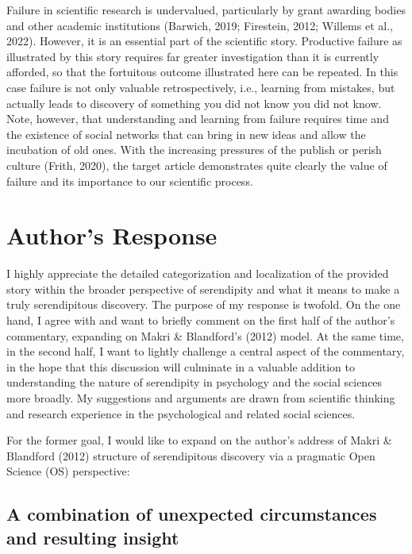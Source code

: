 \documentclass[authordate, commentary]{jote-new-article}
\begin{document}
	
	Failure in scientific research is undervalued, particularly by grant awarding bodies and other academic institutions (Barwich, 2019; Firestein, 2012; Willems et al., 2022). However, it is an essential part of the scientific story. Productive failure as illustrated by this story requires far greater investigation than it is currently afforded, so that the fortuitous outcome illustrated here can be repeated. In this case failure is not only valuable retrospectively, i.e., learning from mistakes, but actually leads to discovery of something you did not know you did not know.  Note, however, that understanding and learning from failure requires time and the existence of social networks that can bring in new ideas and allow the incubation of old ones. With the increasing pressures of the publish or perish culture (Frith, 2020), the target article demonstrates quite clearly the value of failure and its importance to our scientific process.



	\section{Author's Response}



	I highly appreciate the detailed categorization and localization of the provided story within the broader perspective of serendipity and what it means to make a truly serendipitous discovery. The purpose of my response is twofold. On the one hand, I agree with and want to briefly comment on the first half of the author's commentary, expanding on Makri \& Blandford's (2012) model. At the same time, in the second half, I want to lightly challenge a central aspect of the commentary, in the hope that this discussion will culminate in a valuable addition to understanding the nature of serendipity in psychology and the social sciences more broadly. My suggestions and arguments are drawn from scientific thinking and research experience in the psychological and related social sciences.



	For the former goal, I would like to expand on the author's address of Makri \& Blandford (2012) structure of serendipitous discovery via a pragmatic Open Science (OS) perspective:



	\subsection{A combination of unexpected circumstances and resulting insight}
\end{document}
